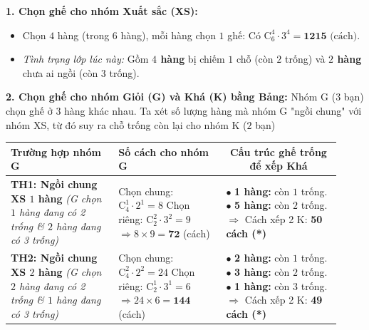 \begin{ex}
{		\textbf{1. Chọn ghế cho nhóm Xuất sắc (XS):}
		\begin{itemize}
			\item Chọn $4$ hàng (trong $6$ hàng), mỗi hàng chọn $1$ ghế: Có $\mathrm{C}_6^4 \cdot 3^4 = \mathbf{1215} \text{ (cách)}$.
			\item \textit{Tình trạng lớp lúc này:} Gồm \textbf{$4$ hàng} bị chiếm $1$ chỗ (còn $2$ trống) và \textbf{$2$ hàng} chưa ai ngồi (còn $3$ trống).
		\end{itemize}
		\textbf{2. Chọn ghế cho nhóm Giỏi (G) và Khá (K) bằng Bảng:}
		Nhóm G ($3$ bạn) chọn ghế ở $3$ hàng khác nhau. Ta xét số lượng hàng mà nhóm G "ngồi chung" với nhóm XS, từ đó suy ra chỗ trống còn lại cho nhóm K ($2$ bạn)
		\begin{center}
			\renewcommand{\arraystretch}{1.5}
			\begin{tabular}{|p{0.3\linewidth}|p{0.3\linewidth}|p{0.32\linewidth}|}
				\hline
				\centering\textbf{Trường hợp nhóm G} & \centering\textbf{Số cách cho nhóm G} & \multicolumn{1}{c|}{\textbf{Cấu trúc ghế trống để xếp Khá}} \\ \hline
				
				\textbf{TH1: Ngồi chung XS $1$ hàng} \newline
				\textit{(G chọn $1$ hàng đang có 2 trống \newline \& $2$ hàng đang có 3 trống)}
				& Chọn chung: $\mathrm{C}_4^1 \cdot 2^1 = 8$ \newline
				Chọn riêng: $\mathrm{C}_2^2 \cdot 3^2 = 9$ \newline
				$\Rightarrow 8 \times 9 = \mathbf{72}$ (cách)
				& $\bullet$ \textbf{1 hàng:} còn $1$ trống. \newline
				$\bullet$ \textbf{5 hàng:} còn $2$ trống. \newline
				$\Rightarrow$ Cách xếp 2 K: \textbf{50 cách (*)} \\ \hline
				
				\textbf{TH2: Ngồi chung XS $2$ hàng} \newline
				\textit{(G chọn $2$ hàng đang có 2 trống \newline \& $1$ hàng đang có 3 trống)}
				& Chọn chung: $\mathrm{C}_4^2 \cdot 2^2 = 24$ \newline
				Chọn riêng: $\mathrm{C}_2^1 \cdot 3^1 = 6$ \newline
				$\Rightarrow 24 \times 6 = \mathbf{144}$ (cách)
				& $\bullet$ \textbf{2 hàng:} còn $1$ trống. \newline
				$\bullet$ \textbf{3 hàng:} còn $2$ trống. \newline
				$\bullet$ \textbf{1 hàng:} còn $3$ trống. \newline
				$\Rightarrow$ Cách xếp 2 K: \textbf{49 cách (*)} \\ \hline
				

\end{tabular}
\end{center}}
\end{ex}
